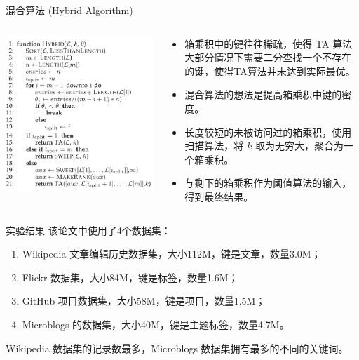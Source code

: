 \documentclass[10pt,aspectratio=169]{ctexbeamer}
\begin{document}
\begin{frame}{混合算法 (Hybrid Algorithm)}
    \begin{columns}
        \begin{column}{.3\textwidth}
            \includegraphics[width=\textwidth]{pic/hybrid.png}
        \end{column}
        \begin{column}{.7\textwidth}
            \begin{itemize}[<+->]
                \item 箱乘积中的键往往稀疏，使得 TA 算法大部分情况下需要二分查找一个不存在的键，使得TA算法并未达到实际最优。
                \item 混合算法的想法是提高箱乘积中键的密度。
                \item 长度较短的未被访问过的箱乘积，使用扫描算法，将 $k$ 取为无穷大，聚合为一个箱乘积。
                \item 与剩下的箱乘积作为阈值算法的输入，得到最终结果。
            \end{itemize}
        \end{column}
    \end{columns}
\end{frame}


\begin{frame}{实验结果}
    该论文中使用了4个数据集：
    \begin{enumerate}
        \item Wikipedia 文章编辑历史数据集，大小112M，键是文章，数量3.0M；
        \item Flickr 数据集，大小84M，键是标签，数量1.6M；
        \item GitHub 项目数据集，大小58M，键是项目，数量1.5M；
        \item Microblogs 的数据集，大小40M，键是主题标签，数量4.7M。
    \end{enumerate}
    Wikipedia 数据集的记录数最多，Microblogs 数据集拥有最多的不同的关键词。
\end{frame}
\end{document}

